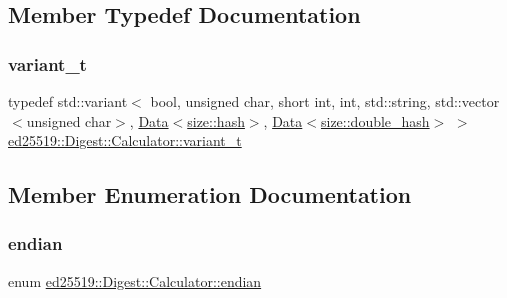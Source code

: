 \subsection{Member Typedef Documentation}
\mbox{\label{structed25519_1_1_digest_1_1_calculator_a477919cc24c842e3cfe76f515ca5c946}} 
\subsubsection{\texorpdfstring{variant\+\_\+t}{variant\_t}}
{\footnotesize\ttfamily typedef std\+::variant$<$ bool, unsigned char, short int, int, std\+::string, std\+::vector$<$unsigned char$>$, \mbox{\hyperlink{classed25519_1_1_data}{Data}}$<$\mbox{\hyperlink{namespaceed25519_1_1size_a0c20525cc9711076ec093177a8e36c25}{size\+::hash}}$>$, \mbox{\hyperlink{classed25519_1_1_data}{Data}}$<$\mbox{\hyperlink{namespaceed25519_1_1size_ac853f864bb12792f88647a998c3c030f}{size\+::double\+\_\+hash}}$>$ $>$ \mbox{\hyperlink{structed25519_1_1_digest_1_1_calculator_a477919cc24c842e3cfe76f515ca5c946}{ed25519\+::\+Digest\+::\+Calculator\+::variant\+\_\+t}}}



\subsection{Member Enumeration Documentation}
\mbox{\label{structed25519_1_1_digest_1_1_calculator_a9bbea874787f93cdf4841b30c1c0d9a3}} 
\subsubsection{\texorpdfstring{endian}{endian}}
{\footnotesize\ttfamily enum \mbox{\hyperlink{structed25519_1_1_digest_1_1_calculator_a9bbea874787f93cdf4841b30c1c0d9a3}{ed25519\+::\+Digest\+::\+Calculator\+::endian}}}

